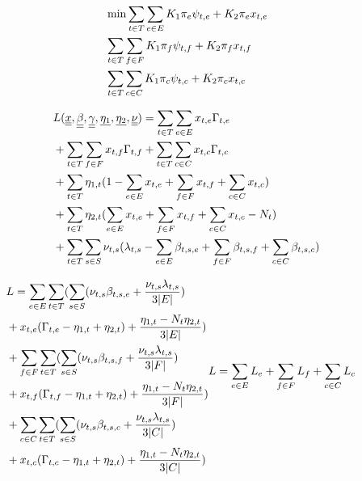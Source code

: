 \documentclass[conference]{IEEEtran}
\begin{document}
    \begin{subequations}
      \begin{align}
        & \notag \min \sum_{t \in T}\sum_{e \in E} K_1\pi_e\psi_{t,e}+K_2\pi_ex_{t,e} \\
        & \notag \sum_{t \in T}\sum_{f \in F} K_1\pi_f\psi_{t,f}+K_2\pi_fx_{t,f} \\
        & \sum_{t \in T}\sum_{c \in C} K_1\pi_c\psi_{t,c}+K_2\pi_cx_{t,c}
      \end{align}
    \end{subequations}

    \begin{subequations}
      \begin{align}
        & \notag L(\underline{\underline x}, \underline{\underline \beta}, \underline{\underline \gamma}, \underline {\eta_1}, \underline {\eta_2}, \underline{\underline \nu}) = \sum_{t \in T}\sum_{e \in E} x_{t,e}\Gamma_{t,e} \\
        & \notag + \sum_{t \in T}\sum_{f \in F} x_{t,f}\Gamma_{t,f} + \sum_{t \in T}\sum_{c \in C} x_{t,c}\Gamma_{t,c} \\
        & \notag + \sum_{t \in T  }{\eta_{1,t}(1-\sum_{e \in E}x_{t,e} + \sum_{f \in F}x_{t,f} + \sum_{c \in C}x_{t,c})} \\
        & \notag + \sum_{t \in T}{\eta_{2,t}(\sum_{e \in E}x_{t,e} + \sum_{f \in F}x_{t,f} + \sum_{c \in C}x_{t,c}-N_t)} \\
        & + \sum_{t \in T}\sum_{s \in S}{\nu_{t,s}(\lambda_{t,s} - \sum_{e \in E}\beta_{t,s,e} + \sum_{f \in F}\beta_{t,s,f} +\sum_{c \in C}\beta_{t,s,c})}
      \end{align}
    \end{subequations}

    \begin{subequations}
      \begin{align}
      & \notag L = \sum_{e \in E}\sum_{t \in T}(\sum_{s \in S}(\nu_{t,s}\beta_{t,s,e}+\frac{\nu_{t,s}\lambda_{t,s}}{3|E|}) \\
      &\notag + x_{t,e}(\Gamma_{t,e}-\eta_{1,t}+\eta_{2,t})+\frac{\eta_{1,t}-N_t\eta_{2,t}}{3|E|}) \\
      & \notag + \sum_{f \in F}\sum_{t \in T}(\sum_{s \in S}(\nu_{t,s}\beta_{t,s,f}+\frac{\nu_{t,s}\lambda_{t,s}}{3|F|}) \\
      & \notag + x_{t,f}(\Gamma_{t,f}-\eta_{1,t}+\eta_{2,t})+\frac{\eta_{1,t}-N_t\eta_{2,t}}{3|F|}) \\
      & \notag + \sum_{c \in C}\sum_{t \in T}(\sum_{s \in S}(\nu_{t,s}\beta_{t,s,c}+\frac{\nu_{t,s}\lambda_{t,s}}{3|C|}) \\
      &+ x_{t,c}(\Gamma_{t,c}-\eta_{1,t}+\eta_{2,t})+\frac{\eta_{1,t}-N_t\eta_{2,t}}{3|C|})
      \end{align}
      \begin{align}
      & L = \sum_{e \in E}L_e + \sum_{f \in F}L_f + \sum_{c \in C}L_c
      \end{align}
    \end{subequations}
\end{document}
